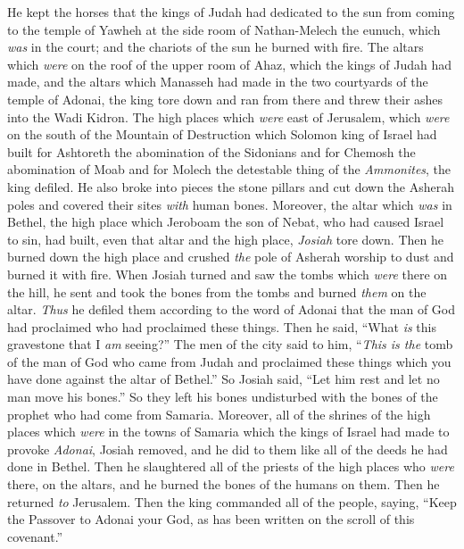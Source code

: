 \begin{biblechapter}
\verse He kept the horses that the kings of Judah had dedicated to the sun from coming to the temple of Yawheh at the side room of Nathan-Melech the eunuch, which \textit{was} in the court; and the chariots of the sun he burned with fire.
\verse The altars which \textit{were} on the roof of the upper room of Ahaz, which the kings of Judah had made, and the altars which Manasseh had made in the two courtyards of the temple of Adonai, the king tore down and ran from there and threw their ashes into the Wadi Kidron.
\verse The high places which \textit{were} east of Jerusalem, which \textit{were} on the south of the Mountain of Destruction which Solomon king of Israel had built for Ashtoreth the abomination of the Sidonians and for Chemosh the abomination of Moab and for Molech the detestable thing of the \textit{Ammonites}, the king defiled.
\verse He also broke into pieces the stone pillars and cut down the Asherah poles and covered their sites \textit{with} human bones.
\verse Moreover, the altar which \textit{was} in Bethel, the high place which Jeroboam the son of Nebat, who had caused Israel to sin, had built, even that altar and the high place, \textit{Josiah} tore down. Then he burned down the high place and crushed \textit{the} pole of Asherah worship to dust and burned it with fire.
\verse When Josiah turned and saw the tombs which \textit{were} there on the hill, he sent and took the bones from the tombs and burned \textit{them} on the altar. \textit{Thus} he defiled them according to the word of Adonai that the man of God had proclaimed who had proclaimed these things.
\verse Then he said, “What \textit{is} this gravestone that I \textit{am} seeing?” The men of the city said to him, “\textit{This is the} tomb of the man of God who came from Judah and proclaimed these things which you have done against the altar of Bethel.”
\verse So Josiah said, “Let him rest and let no man move his bones.” So they left his bones undisturbed with the bones of the prophet who had come from Samaria.
\verse Moreover, all of the shrines of the high places which \textit{were} in the towns of Samaria which the kings of Israel had made to provoke \textit{Adonai}, Josiah removed, and he did to them like all of the deeds he had done in Bethel.
\verse Then he slaughtered all of the priests of the high places who \textit{were} there, on the altars, and he burned the bones of the humans on them. Then he returned \textit{to} Jerusalem.
 Then the king commanded all of the people, saying, “Keep the Passover to Adonai your God, as has been written on the scroll of this covenant.”

\end{biblechapter}
